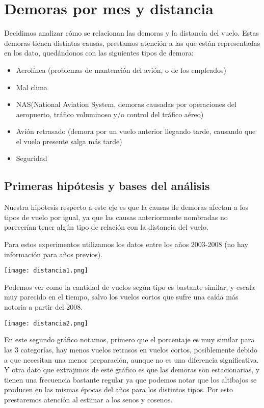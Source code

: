 \section{Demoras por mes y distancia}

Decidimos analizar cómo se relacionan las demoras y la distancia del vuelo. Estas demoras tienen distintas causas, prestamos atención a las que están representadas en los dato, quedándonos con las siguientes tipos de demora:
\begin{itemize}
\item Aerolínea (problemas de mantención del avión, o de los empleados)
\item Mal clima
\item NAS(National Aviation System, demoras causadas por operaciones del aeropuerto, tráfico voluminoso y/o control del tráfico aéreo)
\item Avión retrasado (demora por un vuelo anterior llegando tarde, causando que el vuelo presente salga más tarde)
\item Seguridad
\end{itemize}

\subsection{Primeras hipótesis y bases del análisis}

Nuestra hipótesis respecto a este eje es que la causas de demoras afectan a los tipos de vuelo por igual, ya que las causas anteriormente nombradas no parecerían tener algún tipo de relación con la distancia del vuelo.

Para estos experimentos utilizamos los datos entre los años 2003-2008 (no hay información para años previos). 

\texttt{[image: distancia1.png]}

Podemos ver como la cantidad de vuelos según tipo es bastante similar, y escala muy parecido en el tiempo, salvo los vuelos cortos que sufre una caída más notoria a partir del 2008.

\texttt{[image: distancia2.png]}

En este segundo gráfico notamos, primero que el porcentaje es muy similar para las 3 categorías, hay menos vuelos retrasos en vuelos cortos, posiblemente debido a que necesitan una menor preparación, aunque no es una diferencia significativa. Y otra dato que extrajimos de este gráfico es que las demoras son estacionarias, y tienen una frecuencia bastante regular ya que podemos notar que los altibajos se producen en las mismas épocas del años para los distintos tipos. Por esto prestaremos atención al estimar a los senos y cosenos.


